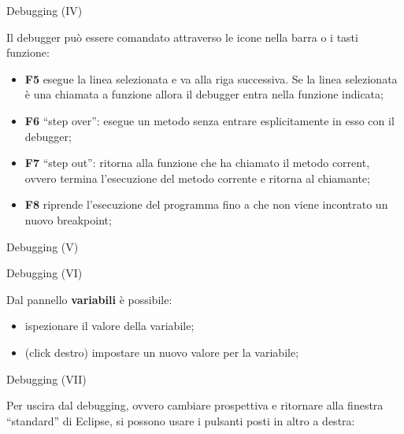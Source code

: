 \begin{frame}{Debugging (IV)}

  Il debugger pu\`o essere comandato attraverso le icone nella barra o i tasti funzione:
  \begin{itemize}
    \item \textbf{F5} esegue la linea selezionata e va alla riga successiva. Se la linea selezionata \`e una chiamata a funzione allora il debugger entra nella funzione indicata;
    \item \textbf{F6} ``step over'': esegue un metodo senza entrare esplicitamente in esso con il debugger;
    \item \textbf{F7} ``step out'': ritorna alla funzione che ha chiamato il metodo corrent, ovvero termina l'esecuzione del metodo corrente e ritorna al chiamante;
    \item \textbf{F8} riprende l'esecuzione del programma fino a che non viene incontrato un nuovo breakpoint;
  \end{itemize}

\end{frame}

\begin{frame}{Debugging (V)}

  \begin{center}
  \end{center}

\end{frame}

\begin{frame}{Debugging (VI)}

  Dal pannello \textbf{variabili} è possibile:
  \begin{itemize}
    \item ispezionare il valore della variabile;
    \item (click destro) impostare un nuovo valore per la variabile;
  \end{itemize}

\end{frame}

\begin{frame}{Debugging (VII)}

  Per uscira dal debugging, ovvero cambiare prospettiva e ritornare alla finestra ``standard''
  di Eclipse, si possono usare i pulsanti posti in altro a destra:

  \begin{center}
  \end{center}
\end{frame}
